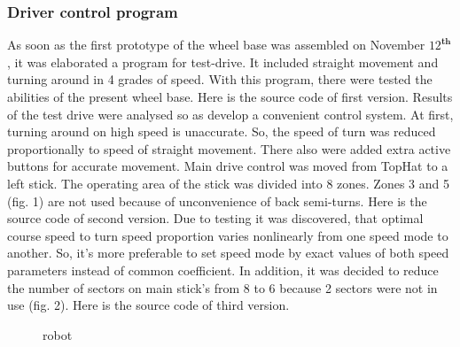 \subsubsection{Driver control program}
	
	As soon as the first prototype of the wheel base was assembled on November $12^\textbf{th}$, it was elaborated a program for test-drive. It included straight movement and turning around in 4 grades of speed. With this program, there were tested the abilities of the present wheel base.
	Here is the source code of first version.
	Results of the test drive were analysed so as develop a convenient control system. At first, turning around on high speed is unaccurate. So, the speed of turn was reduced proportionally to speed of straight movement. There also were added extra active buttons for accurate movement. Main drive control was moved from TopHat to a left stick. The operating area of the stick was divided into 8 zones. Zones 3 and 5 (fig. 1) are not used because of unconvenience of back semi-turns.
	Here is the source code of second version.
	Due to testing it was discovered, that optimal course speed to turn speed proportion varies nonlinearly from one speed mode to another. So, it's more preferable to set speed mode by exact values of both speed parameters instead of common coefficient. In addition, it was decided to reduce the number of sectors on main stick's from 8 to 6 because 2 sectors were not in use (fig. 2).
	Here is the source code of third version.
	
  	\begin{figure}[H]
  		\begin{minipage}[h]{1\linewidth}
  			\caption{robot}
  		\end{minipage}
  	\end{figure}
  	
